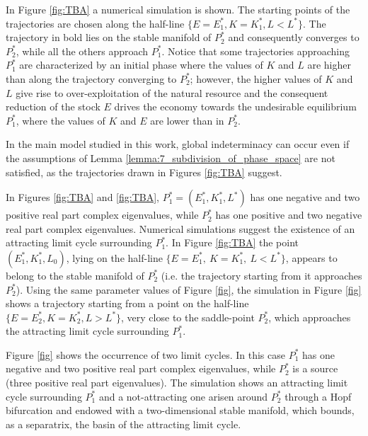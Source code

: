 In Figure \ref{fig:TBA} a numerical simulation is shown. The starting points of the trajectories are chosen along the half-line $\{E=E_1^*, K=K_1^*, L<L^*\}$. The trajectory in bold lies on the stable manifold of $P_2^*$ and consequently converges to $P_2^*$, while all the others approach $P_1^*$. Notice that some trajectories approaching $P_1^*$ are characterized by an initial phase where the values of $K$ and $L$ are higher than along the trajectory converging to $P_2^*$; however, the higher values of $K$ and $L$ give rise to over-exploitation of the natural resource and the consequent reduction of the stock $E$ drives the economy towards the undesirable equilibrium $P_1^*$, where the values of $K$ and $E$ are lower than in $P_2^*$.

In the main model studied in this work, global indeterminacy can occur even if the assumptions of Lemma \ref{lemma:7_subdivision_of_phase_space} are not satisfied, as the trajectories drawn in Figures \ref{fig:TBA} suggest.

In Figures \ref{fig:TBA} and \ref{fig:TBA}, $P_1^*=(E_1^*,K_1^*,L^*)$ has one negative and two positive real part complex eigenvalues, while $P_2^*$ has one positive and two negative real part complex eigenvalues. Numerical simulations suggest the existence of an attracting limit cycle surrounding $P_1^*$. In Figure \ref{fig:TBA} the
point $(E_1^*,K_1^*,L_0)$, lying on the half-line $\{E = E_1^*,\ K = K_1^*,\ L < L^*\}$, appears to belong to the stable manifold of $P_2^*$ (i.e. the trajectory starting from it approaches $P_2^*$). Using the same parameter values of Figure \ref{fig}, the simulation in Figure \ref{fig} shows a trajectory starting from a point on the half-line $\{E = E_2^*, K = K_2^*, L > L^*\}$, very close to the saddle-point $P_2^*$, which approaches
the attracting limit cycle surrounding $P_1^*$.

Figure \ref{fig} shows the occurrence of two limit cycles. In this case $P_1^*$ has one negative and two positive real part complex eigenvalues, while $P_2^*$ is a source (three positive real part eigenvalues). The simulation shows an attracting limit cycle surrounding $P_1^*$ and a not-attracting one arisen around $P_2^*$ through a Hopf bifurcation and endowed with a two-dimensional stable manifold, which bounds, as a separatrix, the basin of the attracting limit cycle.